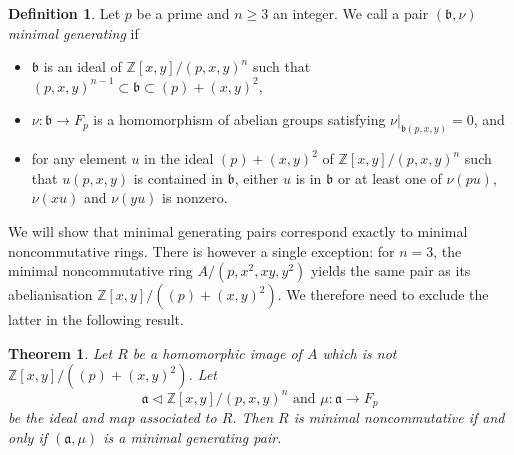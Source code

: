 \documentclass[11pt]{article}
\newtheorem{theorem}[corollary]{Theorem}
\theoremstyle{definition}
\newtheorem{definition}[corollary]{Definition}
\begin{document}
\begin{definition}\label{MinimalGenerating}
Let $p$ be a prime and $n\geq 3$ an integer. We call a pair $\left(\mathfrak{b},\nu\right)$ \textit{minimal generating} if
\begin{itemize}[topsep=0pt]
\item[(1)] $\mathfrak{b}$ is an ideal of $\mathbb{Z}[x,y]/(p,x,y)^n$ such that $(p,x,y)^{n-1}\subset\mathfrak{b}\subset(p)+(x,y)^2$,
\item[(2)] $\nu:\mathfrak{b}\to F_p$ is a homomorphism of abelian groups satisfying $\nu|_{\mathfrak{b}(p,x,y)}=0$, and
\item[(3)] for any element $u$ in the ideal $(p)+(x,y)^2$ of $\mathbb{Z}[x,y]/(p,x,y)^n$ such that $u(p,x,y)$ is contained in $\mathfrak{b}$, either $u$ is in $\mathfrak{b}$ or at least one of $\nu(pu)$, $\nu(xu)$ and $\nu(yu)$ is nonzero.
\end{itemize}
\end{definition}

We will show that minimal generating pairs correspond exactly to minimal noncommutative rings. There is however a single exception: for $n=3$, the minimal noncommutative ring $A/\left(p,x^2,xy,y^2\right)$ yields the same pair as its abelianisation $\mathbb{Z}[x,y]/\left((p)+(x,y)^2\right)$. We therefore need to exclude the latter in the following result.

\begin{theorem}\label{MinimalRingGivesMGPair}
Let $R$ be a homomorphic image of $A$ which is not $\mathbb{Z}[x,y]/\left((p)+(x,y)^2\right)$. Let
\[\mathfrak{a}\lhd \mathbb{Z}[x,y]/(p,x,y)^n \text{ and }\mu:\mathfrak{a}\to F_p\]
be the ideal and map associated to $R$. Then $R$ is minimal noncommutative if and only if $\left(\mathfrak{a},\mu\right)$ is a minimal generating pair.
\end{theorem}
\end{document}
